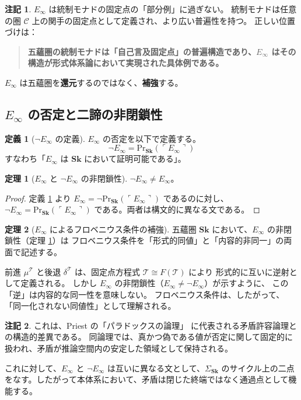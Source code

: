 \documentclass[11pt,a4paper]{article}
\theoremstyle{definition}
\newtheorem{definition}{定義}[section]
\newtheorem{theorem}{定理}[section]
\newtheorem{remark}{注記}[section]
\newcommand{\Sk}{\mathbf{Sk}}
\newcommand{\T}{\mathcal{T}}
\newcommand{\fold}{\mu}
\newcommand{\unfold}{\delta}
\newcommand{\PrSk}{\mathrm{Pr}_{\Sk}}
\newcommand{\Einf}{E_{\infty}}
\newcommand{\SigmaSk}{\Sigma_{\Sk}}
\begin{document}
\begin{remark}
$\Einf$ は統制モナドの固定点の「部分例」に過ぎない。
統制モナドは任意の圏 $\mathcal{C}$ 上の関手の固定点として定義され、より広い普遍性を持つ。
正しい位置づけは：
\begin{quote}
\textbf{五蘊圏の統制モナドは「自己言及固定点」の普遍構造であり、$\Einf$ はその構造が形式体系論において実現された具体例である。}
\end{quote}
$\Einf$ は五蘊圏を\textbf{還元}するのではなく、\textbf{補強}する。
\end{remark}

\subsection{$E_{\infty}$ の否定と二諦の非閉鎖性}

\begin{definition}[$\neg\Einf$ の定義]\label{def:neg-e-infinity}
$\Einf$ の否定を以下で定義する。
\begin{equation}
\neg\Einf = \PrSk(\ulcorner \Einf \urcorner)
\end{equation}
すなわち「$\Einf$ は $\Sk$ において証明可能である」。
\end{definition}

\begin{theorem}[$\Einf$ と $\neg\Einf$ の非閉鎖性]\label{thm:non-closure}
$\neg\Einf \neq \Einf$。
\end{theorem}
\begin{proof}
定義 \ref{def:neg-e-infinity} より $\Einf = \neg\PrSk(\ulcorner \Einf \urcorner)$ であるのに対し、$\neg\Einf = \PrSk(\ulcorner \Einf \urcorner)$ である。両者は構文的に異なる文である。
\end{proof}

\begin{theorem}[$\Einf$ によるフロベニウス条件の補強]\label{thm:e-infinity-frobenius}
五蘊圏 $\Sk$ において、$\Einf$ の非閉鎖性（定理 \ref{thm:non-closure}）は
フロベニウス条件を「形式的同値」と「内容的非同一」の両面で記述する。

前進 $\fold^\T$ と後退 $\unfold^\T$ は、固定点方程式 $\T \cong F(\T)$ により
形式的に互いに逆射として定義される。
しかし $\Einf$ の非閉鎖性（$\Einf \neq \neg\Einf$）が示すように、
この「逆」は内容的な同一性を意味しない。
フロベニウス条件は、したがって、
「同一化されない同値性」として理解される。
\end{theorem}

\begin{remark}
これは、Priest の「パラドックスの論理」\cite{Priest1979} に代表される矛盾許容論理との構造的差異である。
同論理では、真かつ偽である値が否定に関して固定的に扱われ、矛盾が推論空間内の安定した領域として保持される。

これに対して、$\Einf$ と $\neg\Einf$ は互いに異なる文として、$\SigmaSk$ のサイクル上の二点をなす。したがって本体系において、矛盾は閉じた終端ではなく通過点として機能する。
\end{remark}
\end{document}
